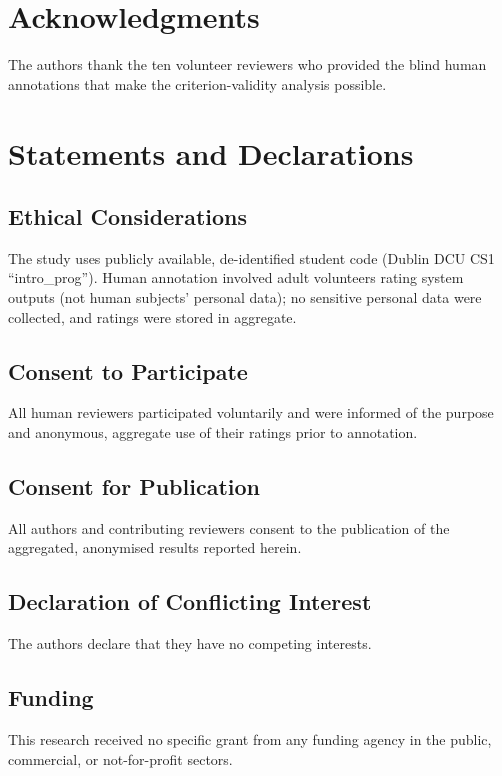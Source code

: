 \documentclass[sageh]{sagej}
\begin{document}
\section*{Acknowledgments}
The authors thank the ten volunteer reviewers who provided the blind human annotations that make the criterion-validity analysis possible.

\section*{Statements and Declarations}
\subsection*{Ethical Considerations}
The study uses publicly available, de-identified student code (Dublin DCU CS1 ``intro\_prog''). Human annotation involved adult volunteers rating system outputs (not human subjects' personal data); no sensitive personal data were collected, and ratings were stored in aggregate.

\subsection*{Consent to Participate}
All human reviewers participated voluntarily and were informed of the purpose and anonymous, aggregate use of their ratings prior to annotation.

\subsection*{Consent for Publication}
All authors and contributing reviewers consent to the publication of the aggregated, anonymised results reported herein.

\subsection*{Declaration of Conflicting Interest}
The authors declare that they have no competing interests.

\subsection*{Funding}
This research received no specific grant from any funding agency in the public, commercial, or not-for-profit sectors.
\end{document}
